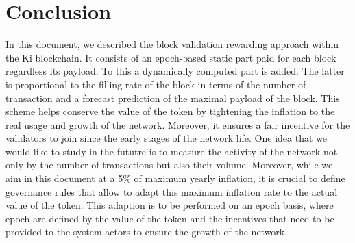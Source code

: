 \documentclass[conference]{IEEEtran}
\begin{document}
\section{Conclusion}
In this document, we described the block validation rewarding approach within the Ki blockchain. It consists of an epoch-based static part paid for each block regardless its payload. To this a dynamically computed part is added. The latter is proportional to the filling rate of the block in terms of the number of transaction and a forecast prediction of the maximal payload of the block. This scheme helps conserve the value of the token by tightening the inflation to the real usage and growth of the network. Moreover, it ensures a fair incentive for the validators to join since the early stages of the network life. One idea that we would like to study in the fututre is to measure the activity of the network not only by the number of transactions but also their volume. Moreover, while we aim in this document at a 5\% of maximum yearly inflation, it is crucial to define governance rules that allow to adapt this maximum inflation rate to the actual value of the token. This adaption is to be performed on an epoch basis, where epoch are defined by the value of the token and the incentives that need to be provided to the system actors to ensure the growth of the network.

\label{sec:conclusion}
\end{document}
